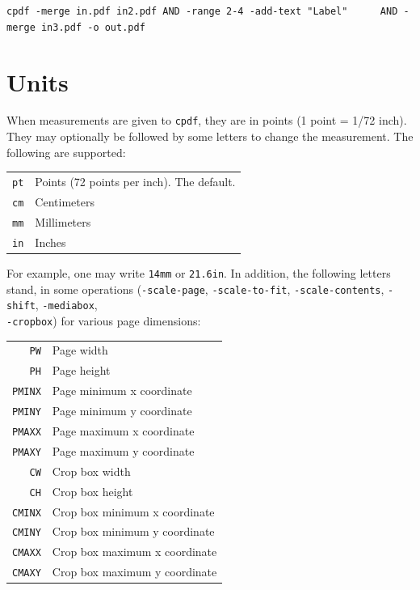 \documentclass{book}
\newcommand{\cpdf}{\texttt{cpdf}}
\begin{document}
\begin{framed}
  \noindent\small\verb!cpdf -merge in.pdf in2.pdf AND -range 2-4 -add-text "Label"!
  \noindent\small\verb!     AND -merge in3.pdf -o out.pdf!
\end{framed}

\section{Units}
When measurements are given to \cpdf, they are in points (1 point = 1/72 inch). They may optionally
be followed by some letters to change the measurement. The following are
supported:

\begin{center}
\begin{tabular}{rl}
  \texttt{pt} & Points (72 points per inch). The default. \\
  \texttt{cm} & Centimeters \\
  \texttt{mm} & Millimeters \\
  \texttt{in} & Inches \\
\end{tabular}
\end{center}

\noindent For example, one may write \texttt{14mm} or \texttt{21.6in}. In addition, the following letters stand, in some operations (\texttt{-scale-page}, \texttt{-scale-to-fit}, \texttt{-scale-contents}, \texttt{-shift}, \texttt{-mediabox},\\ \texttt{-cropbox}) for various page dimensions:

\begin{center}
\begin{tabular}{rl}
  \texttt{PW} & Page width\\
  \texttt{PH} & Page height\\
  \texttt{PMINX} & Page minimum x coordinate\\
  \texttt{PMINY} & Page minimum y coordinate\\
  \texttt{PMAXX} & Page maximum x coordinate\\
  \texttt{PMAXY} & Page maximum y coordinate\\
  \texttt{CW} & Crop box width\\
  \texttt{CH} & Crop box height\\
  \texttt{CMINX} & Crop box minimum x coordinate\\
  \texttt{CMINY} & Crop box minimum y coordinate\\
  \texttt{CMAXX} & Crop box maximum x coordinate\\
  \texttt{CMAXY} & Crop box maximum y coordinate
\end{tabular}
\end{center}
\end{document}
